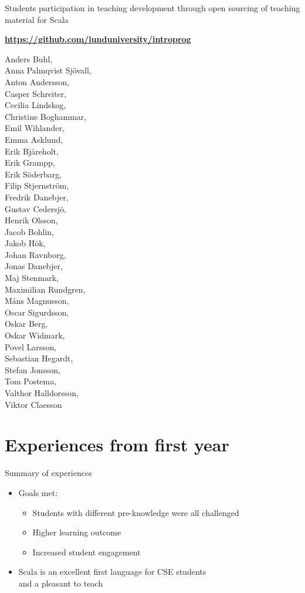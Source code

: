 \documentclass{lecturenotes}
\newcommand{\Section}[1]{\section{#1}\frame{\centering\huge\bfseries\textcolor{blue}{#1}}}
\begin{document}
\begin{Slide}{Students participation in teaching development through open sourcing of teaching material for Scala}

\textbf{\url{https://github.com/lunduniversity/introprog}}

\begin{multicols}{3}\footnotesize
Anders Buhl, \\Anna Palmqvist Sjövall, \\Anton Andersson, \\Casper Schreiter, \\Cecilia Lindskog, \\Christine Boghammar, \\Emil Wihlander, \\Emma Asklund, \\Erik Bjäreholt, \\Erik Grampp, \\Erik Söderbarg, \\Filip Stjernström, \\Fredrik Danebjer, \\Gustav Cedersjö, \\Henrik Olsson, \\Jacob Bohlin, \\Jakob Hök, \\Johan Ravnborg, \\Jonas Danebjer, \\Maj Stenmark, \\Maximilian Rundgren, \\Måns Magnusson, \\Oscar Sigurdsson, \\Oskar Berg, \\Oskar Widmark, \\Povel Larsson, \\Sebastian Hegardt, \\Stefan Jonsson, \\Tom Postema, \\Valthor Halldorsson, \\Viktor Claesson
\end{multicols}

\end{Slide}



\Section{Experiences from first year}


\begin{Slide}{Summary of experiences}
\begin{itemize}
\item Goals met:
\begin{itemize}
\item Students with different pre-knowledge were all challenged
\item Higher learning outcome
\item Increased student engagement
\end{itemize}
\item Scala is an excellent first language for CSE students\\ and a pleasant to teach
\end{itemize}
\end{Slide}
\end{document}
